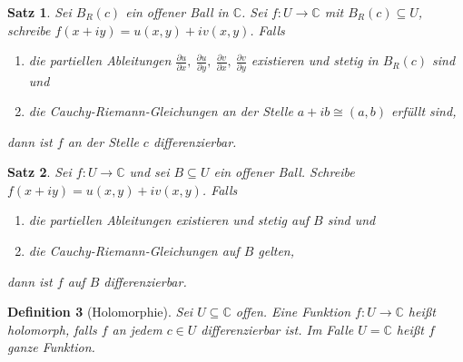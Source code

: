 \documentclass[a4paper,12pt]{article}
\theoremstyle{newthm}
\newtheorem{thm}{Satz}[subsection]
\theoremstyle{newdef}
\newtheorem{defn}[thm]{Definition}
\theoremstyle{newrem}
\newcommand{\C}{\mathbb{C}}
\newcommand{\del}{\partial}
\begin{document}
		\begin{thm}
			Sei $ B_R(c) $ ein offener Ball in $\C$. Sei $ f: U \to \C $ mit $ B_R(c) \subseteq U $, schreibe $ f(x+iy) = u(x,y) + iv(x,y) $. Falls 
			\begin{enumerate}[label={\roman*})]
				\item die partiellen Ableitungen $ \frac{\del u}{\del x},\ \frac{\del u}{\del y},\ \frac{\del v}{\del x},\ \frac{\del v}{\del y} $ existieren und stetig in $ B_R(c) $ sind und
				\item die Cauchy-Riemann-Gleichungen an der Stelle $ a+ib \cong (a,b) $ erfüllt sind,
			\end{enumerate}
			dann ist $f$ an der Stelle $c$ differenzierbar.
		\end{thm}
		
		\begin{thm}
			Sei $ f: U \to \C $ und sei $ B \subseteq U $ ein offener Ball. Schreibe $ f(x+iy) = u(x,y) + iv(x,y) $. Falls 
			\begin{enumerate}[label={\roman*})]
				\item die partiellen Ableitungen existieren und stetig auf $B$ sind und
				\item die Cauchy-Riemann-Gleichungen auf $B$ gelten,
			\end{enumerate}
			dann ist $f$ auf $B$ differenzierbar.
		\end{thm}
		
		\begin{defn}[Holomorphie]
			Sei $U \subseteq \C$ offen. Eine Funktion $ f: U \to \C $ heißt \emph{holomorph}, falls $f$ an jedem $ c \in U $ differenzierbar ist. Im Falle $ U = \C $ heißt $f$ \emph{ganze Funktion}.
		\end{defn}
		
\end{document}
